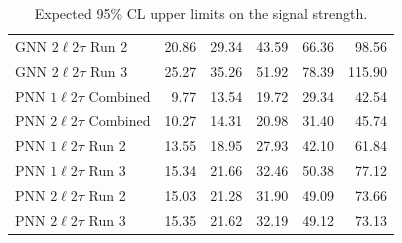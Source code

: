 \begin{table}[h]
\begin{tabular}{lrrrrr}
GNN $2\ell 2\tau$ Run 2 & 20.86 & 29.34 & 43.59 & 66.36 & 98.56 \\
GNN $2\ell 2\tau$ Run 3 & 25.27 & 35.26 & 51.92 & 78.39 & 115.90 \\
PNN $1\ell 2\tau$ Combined & 9.77 & 13.54 & 19.72 & 29.34 & 42.54 \\
PNN $2\ell 2\tau$ Combined & 10.27 & 14.31 & 20.98 & 31.40 & 45.74 \\
PNN $1\ell 2\tau$ Run 2 & 13.55 & 18.95 & 27.93 & 42.10 & 61.84 \\
PNN $1\ell 2\tau$ Run 3 & 15.34 & 21.66 & 32.46 & 50.38 & 77.12 \\
PNN $2\ell 2\tau$ Run 2 & 15.03 & 21.28 & 31.90 & 49.09 & 73.66 \\
PNN $2\ell 2\tau$ Run 3 & 15.35 & 21.62 & 32.19 & 49.12 & 73.13 \\
\hline
\end{tabular}
\caption{Expected 95\% CL upper limits on the signal strength.}
\label{tab:limits}
\end{table}